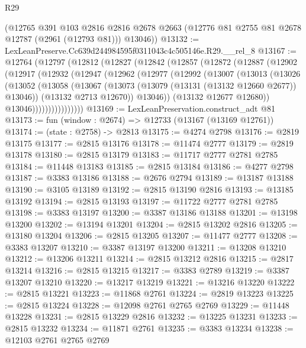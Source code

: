 \begin{lexlean}{R29}
\begin{coremodule}
      (@12765
        @391
        @103
        @2816
        @2816
        @2678
        @2663
        (@12776 @81 @2755 @81 @2678 @12787 (@2961 (@12793 @81)))
        @13046))
@13132 := LexLeanPreserve.Cc639d244984595f0311043c4c505146e.R29.__rel_8
@13167 := @12764
    (@12797
      (@12812
        (@12827
          (@12842
            (@12857
              (@12872
                (@12887
                  (@12902
                    (@12917
                      (@12932
                        (@12947
                          (@12962
                            (@12977
                              (@12992
                                (@13007
                                  (@13013
                                    (@13026
                                      (@13052
                                        (@13058
                                          (@13067
                                            (@13073 (@13079 (@13131 (@13132 @12660 @2677)) @13046))
                                            (@13132 @2713 @12670))
                                          @13046))
                                      (@13132 @12677 @12680))
                                    @13046))))))))))))))))
@13169 := LexLeanPreservation.construct_adt @81
@13173 := fun (window : @2674) => @12733 (@13167 (@13169 @12761))
@13174 := (state : @2758) -> @2813
@13175 := @4274 @2798
@13176 := @2819 @13175
@13177 := @2815 @13176
@13178 := @11474 @2777
@13179 := @2819 @13178
@13180 := @2815 @13179
@13183 := @11717 @2777 @2781 @2785
@13184 := @11448 @13183
@13185 := @2815 @13184
@13186 := @4277 @2798
@13187 := @3383 @13186
@13188 := @2676 @2794
@13189 := @13187 @13188
@13190 := @3105 @13189
@13192 := @2815 @13190 @2816
@13193 := @13185 @13192
@13194 := @2815 @13193
@13197 := @11722 @2777 @2781 @2785
@13198 := @3383 @13197
@13200 := @3387 @13186 @13188
@13201 := @13198 @13200
@13202 := @13194 @13201
@13204 := @2815 @13202 @2816
@13205 := @13180 @13204
@13206 := @2815 @13205
@13207 := @11477 @2777
@13208 := @3383 @13207
@13210 := @3387 @13197 @13200
@13211 := @13208 @13210
@13212 := @13206 @13211
@13214 := @2815 @13212 @2816
@13215 := @2817 @13214
@13216 := @2815 @13215
@13217 := @3383 @2789
@13219 := @3387 @13207 @13210
@13220 := @13217 @13219
@13221 := @13216 @13220
@13222 := @2815 @13221
@13223 := @11868 @2761
@13224 := @2819 @13223
@13225 := @2815 @13224
@13228 := @12098 @2761 @2765 @2769
@13229 := @11448 @13228
@13231 := @2815 @13229 @2816
@13232 := @13225 @13231
@13233 := @2815 @13232
@13234 := @11871 @2761
@13235 := @3383 @13234
@13238 := @12103 @2761 @2765 @2769

\end{coremodule}
\end{lexlean}

